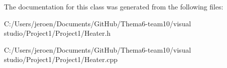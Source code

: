 The documentation for this class was generated from the following files\+:\begin{DoxyCompactItemize}
\item 
C\+:/\+Users/jeroen/\+Documents/\+Git\+Hub/\+Thema6-\/team10/visual studio/\+Project1/\+Project1/Heater.\+h\item 
C\+:/\+Users/jeroen/\+Documents/\+Git\+Hub/\+Thema6-\/team10/visual studio/\+Project1/\+Project1/Heater.\+cpp\end{DoxyCompactItemize}
